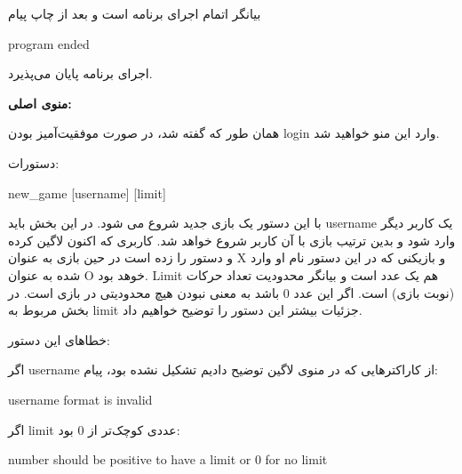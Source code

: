 \documentclass[]{article}
\begin{document}
بیانگر اتمام اجرای برنامه است و بعد از چاپ پیام



\begin{tcolorbox}[boxrule=0pt]
	\begin{latin}
  	  \large{
  	  	program ended
		}
	\end{latin}
\end{tcolorbox}

اجرای برنامه پایان می‌پذیرد.

\hrulefill

\textbf{منوی اصلی:}

همان طور که گفته شد، در صورت موفقیت‌آمیز بودن login وارد این منو خواهید شد.

دستورات:

\begin{tcolorbox}[boxrule=0pt]
	\begin{latin}
  	  \large{
  	  	new\_game [username] [limit]
		}
	\end{latin}
\end{tcolorbox}

با این دستور یک بازی جدید شروع می شود. در این بخش باید username یک کاربر دیگر وارد شود و بدین ترتیب بازی با آن کاربر شروع خواهد شد. کاربری که اکنون لاگین کرده و دستور را زده است در حین بازی به عنوان X و بازیکنی که در این دستور نام او وارد شده به عنوان O خوهد بود. Limit هم یک عدد است و بیانگر محدودیت تعداد حرکات (نوبت بازی) است.  اگر این عدد 0 باشد به معنی نبودن هیچ محدودیتی در بازی است. در بخش مربوط به limit جزئیات بیشتر این دستور را توضیح خواهیم داد. 

خطاهای این دستور:

اگر username از کاراکترهایی که در منوی لاگین توضیح دادیم تشکیل نشده بود، پیام:

\begin{tcolorbox}[boxrule=0pt]
	\begin{latin}
  	  \large{
  	  	username format is invalid
		}
	\end{latin}
\end{tcolorbox}



اگر limit عددی کوچک‌تر از 0 بود:

\begin{tcolorbox}[boxrule=0pt]
	\begin{latin}
  	  \large{
  	  	number should be positive to have a limit or 0 for no limit
		}
	\end{latin}
\end{tcolorbox}
\end{document}
